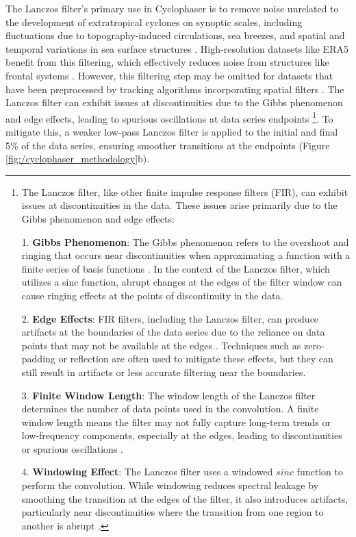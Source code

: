 The Lanczos filter's primary use in Cyclophaser is to remove noise unrelated to the development of extratropical cyclones on synoptic scales, including fluctuations due to topography-induced circulations, sea breezes, and spatial and temporal variations in sea surface structures \citep{steele2015modelling, da2017shallow, acevedo2010atmospheric}. High-resolution datasets like ERA5 benefit from this filtering, which effectively reduces noise from structures like frontal systems \citep{hoskins2002new}. However, this filtering step may be omitted for datasets that have been preprocessed by tracking algorithms incorporating spatial filters \citep[e.g.]{murray1991numerical, pinto2005sensitivities, flaounas2014cyclotrack, hoskins2002new}. The Lanczos filter can exhibit issues at discontinuities due to the Gibbs phenomenon and edge effects, leading to spurious oscillations at data series endpoints \footnote{The Lanczos filter, like other finite impulse response filters (FIR), can exhibit issues at discontinuities in the data. These issues arise primarily due to the Gibbs phenomenon and edge effects:

1. \textbf{Gibbs Phenomenon}: The Gibbs phenomenon refers to the overshoot and ringing that occurs near discontinuities when approximating a function with a finite series of basis functions \citep{gibbs1898, hamming1989}. In the context of the Lanczos filter, which utilizes a sinc function, abrupt changes at the edges of the filter window can cause ringing effects at the points of discontinuity in the data.

2. \textbf{Edge Effects}: FIR filters, including the Lanczos filter, can produce artifacts at the boundaries of the data series due to the reliance on data points that may not be available at the edges \citep{oppenheim2009, proakis2006}. Techniques such as zero-padding or reflection are often used to mitigate these effects, but they can still result in artifacts or less accurate filtering near the boundaries.

3. \textbf{Finite Window Length}: The window length of the Lanczos filter determines the number of data points used in the convolution. A finite window length means the filter may not fully capture long-term trends or low-frequency components, especially at the edges, leading to discontinuities or spurious oscillations \citep{smith1997, oppenheim1999discrete}.

4. \textbf{Windowing Effect}: The Lanczos filter uses a windowed $sinc$ function to perform the convolution. While windowing reduces spectral leakage by smoothing the transition at the edges of the filter, it also introduces artifacts, particularly near discontinuities where the transition from one region to another is abrupt \citep{harris1978, mitra2001}.}. To mitigate this, a weaker low-pass Lanczos filter is applied to the initial and final 5\% of the data series, ensuring smoother transitions at the endpoints (Figure \ref{fig:/cyclophaser_methodology}b).


